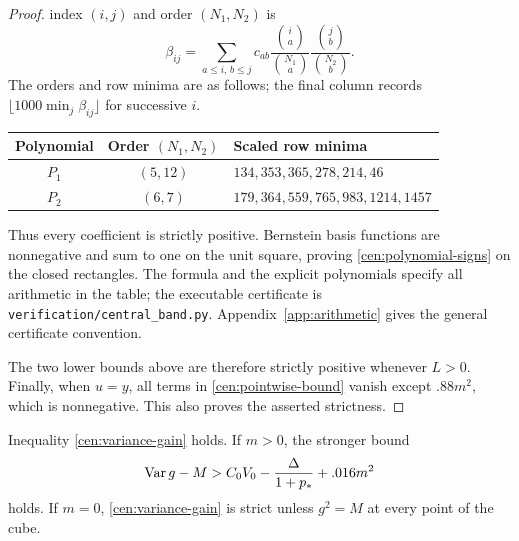 \begin{proof}
index $(i,j)$ and order $(N_1,N_2)$ is
\begin{equation}\label{cen:bernstein-formula}
 \beta_{ij}=\sum_{a\le i,\,b\le j}c_{ab}
       \frac{\binom ia}{\binom{N_1}a}
       \frac{\binom jb}{\binom{N_2}b}.
\end{equation}
The orders and row minima are as follows; the final column records
$\lfloor1000\min_j\beta_{ij}\rfloor$ for successive $i$.
\begin{center}
\begin{tabular}{@{}ccl@{}}
\toprule
Polynomial & Order $(N_1,N_2)$ & Scaled row minima \\
\midrule
$P_1$ & $(5,12)$ & $134,353,365,278,214,46$ \\
$P_2$ & $(6,7)$ & $179,364,559,765,983,1214,1457$ \\
\bottomrule
\end{tabular}
\end{center}
Thus every coefficient is strictly positive.  Bernstein basis functions
are nonnegative and sum to one on the unit square, proving
\eqref{cen:polynomial-signs} on the closed rectangles.  The formula and
the explicit polynomials specify all arithmetic in the table; the
executable certificate is \texttt{verification/central\_band.py}.
Appendix~\ref{app:arithmetic} gives the general certificate convention.

The two lower bounds above are therefore strictly positive whenever
$L>0$.
Finally, when $u=y$, all terms in \eqref{cen:pointwise-bound} vanish
except $.88m^2$, which is nonnegative.  This also proves the asserted
strictness.
\end{proof}

\begin{lemma}\label{cen:strict-variance}
Inequality \eqref{cen:variance-gain} holds.  If $m>0$, the stronger bound
\begin{equation}\label{cen:positive-margin}
 \operatorname{Var} g-M>C_0V_0-\frac\Delta{1+p_*}+.016m^2
\end{equation}
holds.  If $m=0$, \eqref{cen:variance-gain} is strict unless $g^2=M$
at every point of the cube.
\end{lemma}

